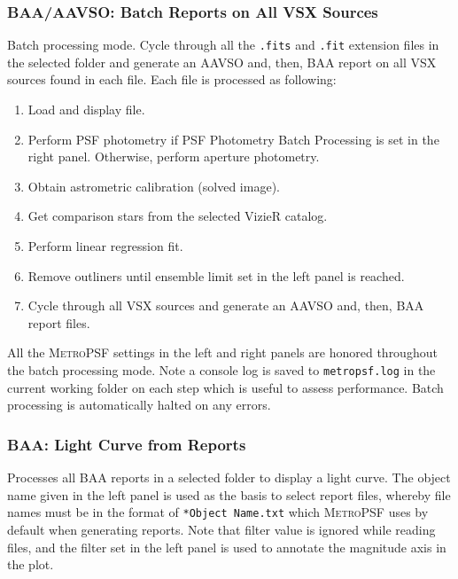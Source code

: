 \documentclass{article}
\begin{document}
\subsubsection{BAA/AAVSO: Batch Reports on All VSX Sources} \label{batch}
Batch processing mode. Cycle through all the \texttt{.fits} and \texttt{.fit} extension files in the selected folder and generate an AAVSO and, then, BAA report on all VSX sources found in each file. Each file is processed as following: 
\begin{enumerate}
\item Load and display file.
\item Perform PSF photometry if PSF Photometry Batch Processing is set in the right panel. Otherwise, perform aperture photometry. 
\item Obtain astrometric calibration (solved image). 
\item Get comparison stars from the selected VizieR catalog. 
\item Perform linear regression fit.
\item Remove outliners until ensemble limit set in the left panel is reached.
\item Cycle through all VSX sources and generate an AAVSO and, then, BAA report files. 
\end{enumerate}
All the \textsc{MetroPSF} settings in the left and right panels are honored throughout the batch processing mode. Note a console log is saved to \texttt{metropsf.log} in the current working folder on each step which is useful to assess performance. Batch processing is automatically halted on any errors.

\subsubsection{BAA: Light Curve from Reports}
Processes all BAA reports in a selected folder to display a light curve. The object name given in the left panel is used as the basis to select report files, whereby file names must be in the format of \texttt{*Object Name.txt} which \textsc{MetroPSF} uses by default when generating reports. Note that filter value is ignored while reading files, and the filter set in the left panel is used to annotate the magnitude axis in the plot.
\end{document}
